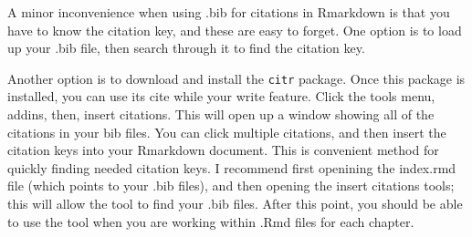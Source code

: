 \documentclass[]{book}
\theoremstyle{definition}
\theoremstyle{definition}
\theoremstyle{definition}
\theoremstyle{remark}
\begin{document}
A minor inconvenience when using .bib for citations in Rmarkdown is that
you have to know the citation key, and these are easy to forget. One
option is to load up your .bib file, then search through it to find the
citation key.

Another option is to download and install the \texttt{citr} package.
Once this package is installed, you can use its cite while your write
feature. Click the tools menu, addins, then, insert citations. This will
open up a window showing all of the citations in your bib files. You can
click multiple citations, and then insert the citation keys into your
Rmarkdown document. This is convenient method for quickly finding needed
citation keys. I recommend first openining the index.rmd file (which
points to your .bib files), and then opening the insert citations tools;
this will allow the tool to find your .bib files. After this point, you
should be able to use the tool when you are working within .Rmd files
for each chapter.


\end{document}
